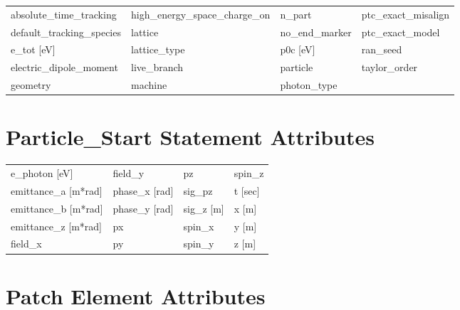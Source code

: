  \begin{tabular}{llll} \toprule
absolute_time_tracking           & high_energy_space_charge_on      & n_part                           & ptc_exact_misalign               \\
default_tracking_species         & lattice                          & no_end_marker                    & ptc_exact_model                  \\
e_tot [eV]                       & lattice_type                     & p0c [eV]                         & ran_seed                         \\
electric_dipole_moment           & live_branch                      & particle                         & taylor_order                     \\
geometry                         & machine                          & photon_type                      &                                  \\
 \bottomrule
 \end{tabular}
 \vfill
 
 \section{Particle_Start Statement Attributes}
 \label{s:list.particle.start}
 
 \begin{tabular}{llll} \toprule
e_photon [eV]                    & field_y                          & pz                               & spin_z                           \\
emittance_a [m*rad]              & phase_x [rad]                    & sig_pz                           & t [sec]                          \\
emittance_b [m*rad]              & phase_y [rad]                    & sig_z [m]                        & x [m]                            \\
emittance_z [m*rad]              & px                               & spin_x                           & y [m]                            \\
field_x                          & py                               & spin_y                           & z [m]                            \\
 \bottomrule
 \end{tabular}
 \vfill
 
 \section{Patch Element Attributes}
 \label{s:list.patch}
 
